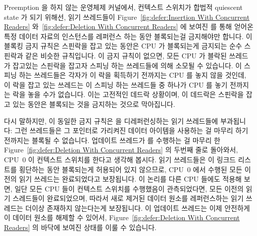 Preemption 을 하지 않는 운영체제 커널에서, 컨텍스트 스위치가 합법적 quiescent
state 가 되기 위해선, 읽기 쓰레드들이
Figure~\ref{fig:defer:Insertion With Concurrent Readers}
와~\ref{fig:defer:Deletion With Concurrent Readers} 에 보여진  를 통해
얻어온 특정 데이터 자료의 인스턴스를 레퍼런스 하는 동안 블록되는걸 금지해야만
합니다.
이 블록킹 금지 규칙은 스핀락을 잡고 있는 동안은 CPU 가 블록되는게 금지되는 순수
스핀락과 같은 비슷한 규칙입니다.
이 금지 규칙이 없으면, 모든 CPU 가 블락된 쓰레드가 잡고있는 스핀락을 잡고자
스피닝 하는 쓰레드들에 의해 소모될 수 있습니다.
이 스피닝 하는 쓰레드들은 각자가 이 락을 획득하기 전까지는 CPU 를 놓지 않을
것인데, 이 락을 잡고 있는 쓰레드는 이 스피닝 하는 쓰레드들 중 하나가 CPU 를
놓기 전까지는 락을 놓을 수가 없습니다.
이는 고전적인 데드락 상황이며, 이 데드락은 스핀락을 잡고 있는 동안은 블록되는
것을 금지하는 것으로 막아집니다.

다시 말하지만, 이 동일한 금지 규칙은  을 디레퍼런싱하는 읽기
쓰레드들에 부과됩니다: 그런 쓰레드들은 그 포인터로 가리켜진 데이터 아이템을
사용하는 걸 마무리 하기 전까지는 블록될 수 없습니다.
업데이트 쓰레드가  를 수행하는 걸 마무리 한
Figure~\ref{fig:defer:Deletion With Concurrent Readers} 의 두번째 줄로
돌아와서, CPU~0 이 컨텍스트 스위치를 한다고 생각해 봅시다.
읽기 쓰레드들은 이 링크드 리스트를 횡단하는 동안 블록되는게 허용되어 있지
않으므로, CPU~0 에서 수행된 모든 이전의 읽기 쓰레드는 완료되었다고 보장됩니다.
이 논리를 다른 CPU 들에도 적용해 보면, 일단 모든 CPU 들이 컨텍스트 스위치를
수행했음이 관측되었다면, 모든 이전의 읽기 스레드들이 완료되었으며, 따라서 새로
제거된 데이터 원소를 레퍼런스하는 읽기 쓰레드는 더이상 존재하지 않는다는게
보장됩니다.
이 업데이트 쓰레드는 이제 안전하게 이 데이터 원소를 해제할 수 있어서,
Figure~\ref{fig:defer:Deletion With Concurrent Readers} 의 바닥에 보여진 상태를
이룰 수 있습니다.
\iffalse

